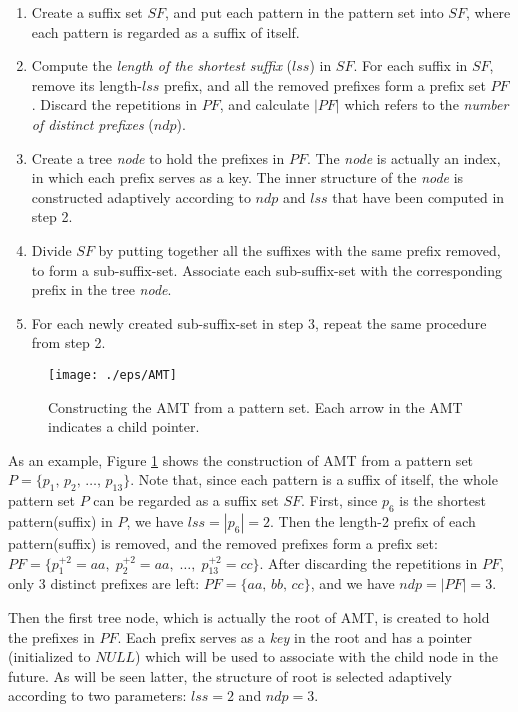 \begin{enumerate}
\item Create a suffix set $SF$, and put each pattern in the pattern
  set into $SF$, where each pattern is regarded as a suffix of itself.
\item Compute the \emph{length of the shortest suffix} ($lss$) in
  $SF$. For each suffix in $SF$, remove its length-$lss$ prefix, and
  all the removed prefixes form a prefix set $PF$. Discard the
  repetitions in $PF$, and calculate $|PF|$ which refers to the
  \emph{number of distinct prefixes} ($ndp$).
\item Create a tree \emph{node} to hold the prefixes in $PF$. The
  \emph{node} is actually an index, in which each prefix serves as a
  key. The inner structure of the \emph{node} is constructed
  adaptively according to $ndp$ and $lss$ that have been computed in
  step 2.
\item Divide $SF$ by putting together all the suffixes with the same
  prefix removed, to form a sub-suffix-set. Associate each
  sub-suffix-set with the corresponding prefix in the tree
  \emph{node}.
\item For each newly created sub-suffix-set in step 3, repeat the same
  procedure from step 2.
\end{enumerate}

\begin{figure}[htbp]
  \centering
  \texttt{[image: ./eps/AMT]}
  \caption{Constructing the AMT from a pattern set. Each arrow
    in the AMT indicates a child pointer.}
  \label{fig:AMT}
\end{figure}

As an example, Figure \ref{fig:AMT} shows the construction of AMT from
a pattern set $P = \{p_1,\, p_2,\, \dots,\, p_{13}\}$. Note that,
since each pattern is a suffix of itself, the whole pattern set $P$
can be regarded as a suffix set $SF$.  First, since $p_6$ is the
shortest pattern(suffix) in $P$, we have $lss = |p_6| = 2$. Then the
length-2 prefix of each pattern(suffix) is removed, and the removed
prefixes form a prefix set:
$PF = \{p_1^{+2} = aa,\; p_2^{+2} = aa,\; \dots,\; p_{13}^{+2} =
cc\}$.  After discarding the repetitions in $PF$, only 3 distinct
prefixes are left: $PF = \{aa,\, bb,\, cc\}$, and we have
$ndp = |PF| = 3$.

Then the first tree node, which is actually the root of AMT, is
created to hold the prefixes in $PF$. Each prefix serves as a
\emph{key} in the root and has a pointer (initialized to $NULL$) which
will be used to associate with the child node in the future. As will
be seen latter, the structure of root is selected adaptively according
to two parameters: $lss=2$ and $ndp=3$.


